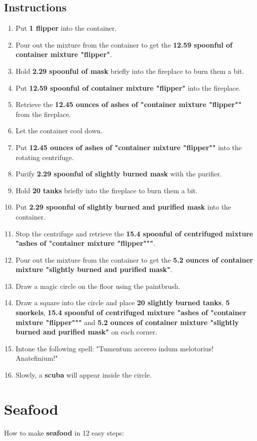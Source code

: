 \documentclass{article}
\begin{document}
\subsection{Instructions}\begin{enumerate}
\item 
Put \textbf{1 flipper} into the container.
\item 
Pour out the mixture from the container to get the \textbf{12.59 spoonful of container mixture "flipper"}.
\item 
Hold \textbf{2.29 spoonful of mask} briefly into the fireplace to burn them a bit.
\item 
Put \textbf{12.59 spoonful of container mixture "flipper"} into the fireplace.
\item 
Retrieve the \textbf{12.45 ounces of ashes of "container mixture "flipper""} from the fireplace.
\item 
Let the container cool down.
\item 
Put \textbf{12.45 ounces of ashes of "container mixture "flipper""} into the rotating centrifuge.
\item 
Purify \textbf{2.29 spoonful of slightly burned mask} with the purifier.
\item 
Hold \textbf{20 tanks} briefly into the fireplace to burn them a bit.
\item 
Put \textbf{2.29 spoonful of slightly burned and purified mask} into the container.
\item 
Stop the centrifuge and retrieve the \textbf{15.4 spoonful of centrifuged mixture "ashes of "container mixture "flipper"""}.
\item 
Pour out the mixture from the container to get the \textbf{5.2 ounces of container mixture "slightly burned and purified mask"}.
\item 
Draw a magic circle on the floor using the paintbrush.
\item 
Draw a square into the circle and place \textbf{20 slightly burned tanks}, \textbf{5 snorkels}, \textbf{15.4 spoonful of centrifuged mixture "ashes of "container mixture "flipper"""} and \textbf{5.2 ounces of container mixture "slightly burned and purified mask"} on each corner.
\item 
Intone the following spell: "Tumentum accereo indum melotorius! Anatefinium!"
\item 
Slowly, a \textbf{scuba} will appear inside the circle.
\end{enumerate}
\newpage
\section{Seafood}How to make \textbf{seafood} in 12 easy steps:
\end{document}
